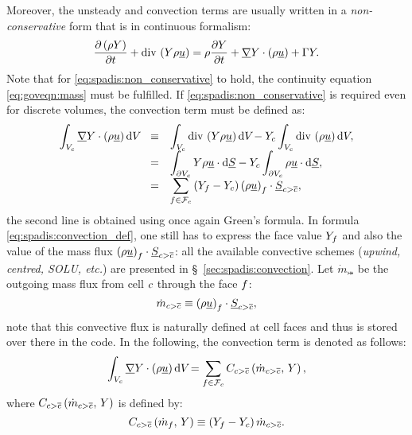 Moreover, the unsteady and convection terms are usually written in a \emph{non-conservative} form that is in continuous formalism:
\begin{equation}\label{eq:spadis:non_conservative}
 \dfrac{\partial  \left( \rho Y \right)}{\partial t} + \text{div}\, \left(  Y  \rho \underline{u}\right) = \rho \dfrac{\partial Y }{\partial t} + \underline{\nabla} Y \cdot \left( \rho \underline{u}\right) + \Gamma Y.
 \end{equation}
 Note that for \eqref{eq:spadis:non_conservative} to hold, the continuity equation \eqref{eq:goveqn:mass} must be fulfilled.
 If \eqref{eq:spadis:non_conservative} is required even for discrete volumes, the convection term must be defined as:
 \begin{equation}\label{eq:spadis:convection_def}
 \begin{array}{r c l}
\displaystyle \int_{V_{c}} \underline{\nabla} Y \cdot \left( \rho \underline{u} \right) \mathrm{d} V_{} &\equiv &
\displaystyle \int_{V_{c}}  \text{div}\, \left( Y \rho \underline{u} \right) \mathrm{d} V_{}  - Y_c  \int_{V_{c}} \text{div}\, \left(\rho \underline{u} \right) \mathrm{d} V_{}, \\
 &=&
 \displaystyle \int_{ \partial V_{c}}   Y \rho \underline{u} \cdot \mathrm{d} \underline{S}  - Y_c  \int_{ \partial V_{c}} \rho \underline{u} \cdot \mathrm{d} \underline{S}, \\
 &=&
\displaystyle \sum_{{f} \in \mathcal{F}_{c}} \left(Y_{f} - Y_c \right) \left(\rho \underline{u}\right)_{f} \cdot \underline{S}_{{c > {\overline{c}}}},
 \end{array}
 \end{equation}
the second line is obtained using once again Green's formula. In formula \eqref{eq:spadis:convection_def}, one still has to express the face value
 $Y_{f}$ and also the value of the mass flux $\left(\rho \underline{u}\right)_{f}\cdot \underline{S}_{{c > {\overline{c}}}}$: all the available convective schemes (\emph{upwind, centred, SOLU, etc.}) are presented in \S~\ref{sec:spadis:convection}. Let $\dot{m}_{\bij}$ be the outgoing
 mass flux from cell $c$ through the face ${f}$:
  \begin{equation}\label{eq:spadis:massflux_def}
\dot{m}_{{c > {\overline{c}}}} \equiv \left(\rho \underline{u}\right)_{f} \cdot \underline{S}_{{c > {\overline{c}}}},
 \end{equation}
note that this convective flux is naturally defined at cell faces and thus is stored over there in the code. In the following, the convection term is denoted as follows:
\begin{equation}\label{eq:spadis:convection_notation}
\displaystyle \int_{V_{c}} \underline{\nabla} Y \cdot \left( \rho \underline{u} \right) \mathrm{d} V_{}
=
\displaystyle \sum_{{f} \in \mathcal{F}_{c}} C_{{c > {\overline{c}}}} \left( \dot{m}_{{c > {\overline{c}}}} , \, Y \right),
 \end{equation}
where $C_{{c > {\overline{c}}}} \left(  \dot{m}_{{c > {\overline{c}}}}  , \, Y\right)$ is defined by:
\begin{equation}\label{eq:spadis:convection_flux}
C_{{c > {\overline{c}}}} \left(\dot{m}_{f} , \, Y \right) \equiv  \left(Y_{f} - Y_c \right) \dot{m}_{{c > {\overline{c}}}}.
 \end{equation}

